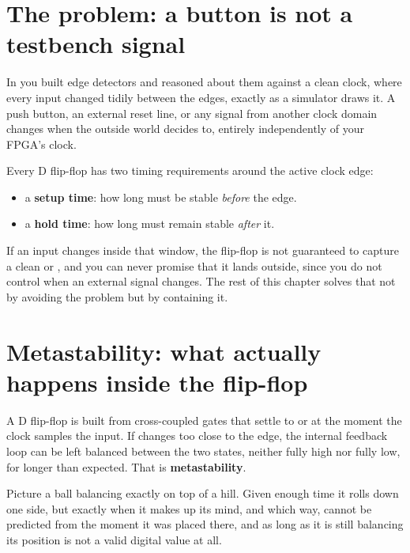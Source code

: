 
\section{The problem: a button is not a testbench signal}
\label{c4:sec:problem}

In  you built edge detectors and reasoned about them against a clean clock, where
every input changed tidily between the edges, exactly as a simulator draws it. A push button, an
external reset line, or any signal from another clock domain changes when the outside world decides
to, entirely independently of your FPGA's clock.

Every D flip-flop has two timing requirements around the active clock edge:
\begin{itemize}
  \item a \textbf{setup time}: how long  must be stable \emph{before} the edge.
  \item a \textbf{hold time}: how long  must remain stable \emph{after} it.
\end{itemize}

If an input changes inside that window, the flip-flop is not guaranteed to capture a clean 
or , and you can never promise that it lands outside, since you do not control when an
external signal changes. The rest of this chapter solves that not by avoiding the problem but by
containing it.

\section{Metastability: what actually happens inside the flip-flop}
\label{c4:sec:meta}

A D flip-flop is built from cross-coupled gates that settle to  or  at the moment
the clock samples the input. If  changes too close to the edge, the internal feedback loop
can be left balanced between the two states, neither fully high nor fully low, for longer than
expected. That is \textbf{metastability}.

Picture a ball balancing exactly on top of a hill. Given enough time it rolls down one side, but
exactly when it makes up its mind, and which way, cannot be predicted from the moment it was placed
there, and as long as it is still balancing its position is not a valid digital value at all.

